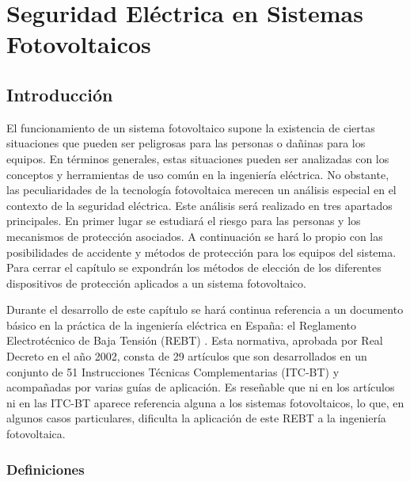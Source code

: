 
\chapter{Seguridad Eléctrica en Sistemas Fotovoltaicos}
\label{sec:seguridad}

\section{Introducción}

El funcionamiento de un sistema fotovoltaico supone la existencia
de ciertas situaciones que pueden ser peligrosas para las personas
o dañinas para los equipos. En términos generales, estas situaciones
pueden ser analizadas con los conceptos y herramientas de uso común
en la ingeniería eléctrica. No obstante, las peculiaridades de la
tecnología fotovoltaica merecen un análisis especial en el contexto
de la seguridad eléctrica. Este análisis será realizado en tres apartados
principales. En primer lugar se estudiará el riesgo para las personas
y los mecanismos de protección asociados. A continuación se hará lo
propio con las posibilidades de accidente y métodos de protección
para los equipos del sistema. Para cerrar el capítulo se expondrán
los métodos de elección de los diferentes dispositivos de protección
aplicados a un sistema fotovoltaico.

Durante el desarrollo de este capítulo se hará continua referencia
a un documento básico en la práctica de la ingeniería eléctrica en
España: el Reglamento Electrotécnico de Baja Tensión (REBT) \cite{RD_842_2002}.
Esta normativa, aprobada por Real Decreto en el año 2002, consta de
29 artículos que son desarrollados en un conjunto de 51 Instrucciones
Técnicas Complementarias (ITC-BT) y acompañadas por varias guías de
aplicación. Es reseñable que ni en los artículos ni en las ITC-BT
aparece referencia alguna a los sistemas fotovoltaicos, lo que, en
algunos casos particulares, dificulta la aplicación de este REBT a
la ingeniería fotovoltaica.


\subsection{Definiciones}


